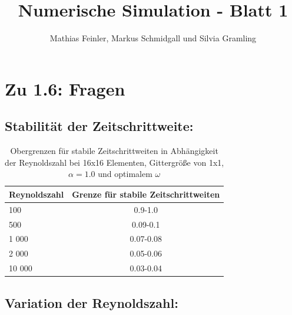 \documentclass[12pt,pdftex,a4paper]{article}
\begin{document}
\newcommand{\scale}{2.36}

\title{Numerische Simulation - Blatt 1}
\author{Mathias Feinler, Markus Schmidgall und Silvia Gramling}
\maketitle

\section*{Zu 1.6: Fragen}

\subsection*{Stabilität der Zeitschrittweite:}

\begin{table}[h]
\begin{tabular}{l|c}
  Reynoldszahl & Grenze für stabile Zeitschrittweiten  \\ \hline
  100 & 0.9-1.0 \\ 
  500 & 0.09-0.1 \\
  1 000 & 0.07-0.08 \\
  2 000 & 0.05-0.06 \\
  10 000 & 0.03-0.04\\ \hline
\end{tabular}
\caption{Obergrenzen für stabile Zeitschrittweiten in Abhängigkeit der Reynoldszahl bei 16x16 Elementen, Gittergröße von 1x1, $\alpha=1.0$ und optimalem $\omega$}
\end{table}

\newpage
\subsection*{Variation der Reynoldszahl:}
\end{document}
